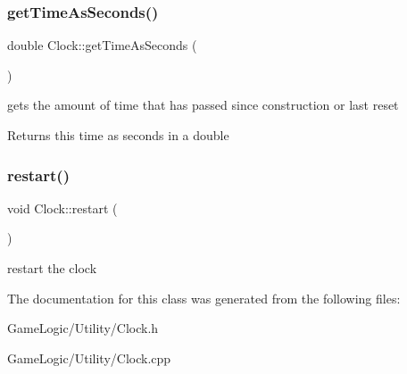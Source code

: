 \subsubsection{\texorpdfstring{get\+Time\+As\+Seconds()}{getTimeAsSeconds()}}
{\footnotesize\ttfamily double Clock\+::get\+Time\+As\+Seconds (\begin{DoxyParamCaption}{ }\end{DoxyParamCaption})}

gets the amount of time that has passed since construction or last reset \begin{DoxyReturn}{Returns}
this time as seconds in a double 
\end{DoxyReturn}
\mbox{\label{classClock_a775bf97123b58c768571868341d28b08}} 
\subsubsection{\texorpdfstring{restart()}{restart()}}
{\footnotesize\ttfamily void Clock\+::restart (\begin{DoxyParamCaption}{ }\end{DoxyParamCaption})}

restart the clock 

The documentation for this class was generated from the following files\+:\begin{DoxyCompactItemize}
\item 
Game\+Logic/\+Utility/Clock.\+h\item 
Game\+Logic/\+Utility/Clock.\+cpp\end{DoxyCompactItemize}
